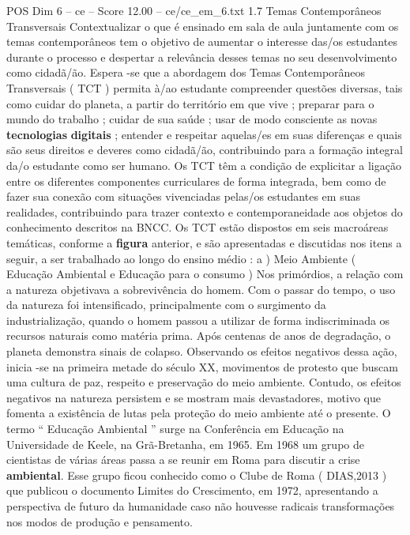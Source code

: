 \begin{textsample}{POS Dim 6 – ce – Score 12.00 – ce/ce\_em\_6.txt}  \label{ex:f6_pos_032}
1.7 Temas Contemporâneos Transversais Contextualizar o que é ensinado em sala de aula juntamente com os temas contemporâneos tem o objetivo de aumentar o interesse das/os estudantes durante o processo e despertar a relevância desses temas no seu desenvolvimento como cidadã/ão.
Espera -se que a abordagem dos Temas Contemporâneos Transversais ( TCT ) permita à/ao estudante compreender questões diversas, tais como cuidar do planeta, a partir do território em que vive ; preparar para o mundo do trabalho ; cuidar de sua saúde ; usar de modo consciente as novas \textbf{tecnologias} \textbf{digitais} ; entender e respeitar aquelas/es em suas diferenças e quais são seus direitos e deveres como cidadã/ão, contribuindo para a formação integral da/o estudante como ser humano.
Os TCT têm a condição de explicitar a ligação entre os diferentes componentes curriculares de forma integrada, bem como de fazer sua conexão com situações vivenciadas pelas/os estudantes em suas realidades, contribuindo para trazer contexto e contemporaneidade aos objetos do conhecimento descritos na BNCC.
Os TCT estão dispostos em seis macroáreas temáticas, conforme a \textbf{figura} anterior, e são apresentadas e discutidas nos itens a seguir, a ser trabalhado ao longo do ensino médio : a ) Meio Ambiente ( Educação Ambiental e Educação para o consumo ) Nos primórdios, a relação com a natureza objetivava a sobrevivência do homem.
Com o passar do tempo, o uso da natureza foi intensificado, principalmente com o surgimento da industrialização, quando o homem passou a utilizar de forma indiscriminada os recursos naturais como matéria prima.
Após centenas de anos de degradação, o planeta demonstra sinais de colapso.
Observando os efeitos negativos dessa ação, inicia -se na primeira metade do século XX, movimentos de protesto que buscam uma cultura de paz, respeito e preservação do meio ambiente.
Contudo, os efeitos negativos na natureza persistem e se mostram mais devastadores, motivo que fomenta a existência de lutas pela proteção do meio ambiente até o presente.
O termo “ Educação Ambiental ” surge na Conferência em Educação na Universidade de Keele, na Grã-Bretanha, em 1965.
Em 1968 um grupo de cientistas de várias áreas passa a se reunir em Roma para discutir a crise \textbf{ambiental}.
Esse grupo ficou conhecido como o Clube de Roma ( DIAS,2013 ) que publicou o documento Limites do Crescimento, em 1972, apresentando a perspectiva de futuro da humanidade caso não houvesse radicais transformações nos modos de produção e pensamento.

\end{textsample}
